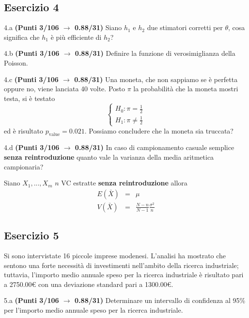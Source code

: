 \documentclass[
  11pt,
]{book}
\theoremstyle{mytheoremstyle}
\theoremstyle{mydefstyle}
\newenvironment{sol}
  {
  \begin{tcolorbox}[enhanced,breakable,arc=0.1mm,boxrule=1pt,colback=white,colframe=iblue,
  title=\bf \fontfamily{lmss}\selectfont \hspace{.5 cm} Soluzione,drop fuzzy shadow]

}{
\end{tcolorbox}
  }
\begin{document}
\subsection{Esercizio 4}\label{esercizio-4-9}

4.a \textbf{(Punti 3/106 \(\rightarrow\) 0.88/31)} Siano \(h_1\) e \(h_2\) due stimatori corretti per \(\theta\), cosa significa che \(h_1\) è più efficiente di \(h_2\)?

4.b \textbf{(Punti 3/106 \(\rightarrow\) 0.88/31)} Definire la funzione di verosimiglianza della Poisson.

4.c \textbf{(Punti 3/106 \(\rightarrow\) 0.88/31)} Una moneta, che non sappiamo se è perfetta oppure no, viene lanciata 40 volte.
Posto \(\pi\) la probabilità che la moneta mostri testa, si è testato
\[
\begin{cases}
H_0:\pi=\frac 12\\
H_1:\pi\ne\frac 12
\end{cases}
\]
ed è risultato \(p_\text{value}=0.021\). Possiamo concludere che la moneta sia truccata?

4.d \textbf{(Punti 3/106 \(\rightarrow\) 0.88/31)} In caso di campionamento casuale semplice \textbf{senza reintroduzione}
quanto vale la varianza della media aritmetica campionaria?

\begin{sol}
Siano \(X_1,...,X_m\) \(n\) VC estratte \textbf{senza reintroduzione} allora
\begin{eqnarray*}
  E(\bar X) &=&  \mu\\
  V(\bar X) &=& \frac{N-n}{N-1}\frac{\sigma^2}{n}
\end{eqnarray*}

\end{sol}

\subsection{Esercizio 5}\label{esercizio-5-7}

Si sono intervistate 16 piccole imprese modenesi.
L'analisi ha mostrato che sentono una forte necessità
di investimenti nell'ambito della ricerca industriale;
tuttavia, l'importo medio annuale speso per la ricerca industriale
è risultato pari a 2750.00€ con una deviazione standard pari
a 1300.00€.

5.a \textbf{(Punti 3/106 \(\rightarrow\) 0.88/31)} Determinare un intervallo di confidenza al 95\%
per l'importo medio annuale speso per la ricerca industriale.
\end{document}
